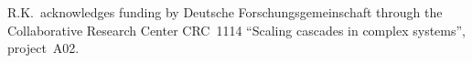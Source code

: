 \documentclass{ametsoc}
\theoremstyle{definition}
\begin{document}
% 

\acknowledgments

R.K.\ acknowledges funding by Deutsche Forschungsgemeinschaft through the Collaborative Research Center CRC~1114 ``Scaling cascades in complex systems'', project~A02. 






%

\end{document}
